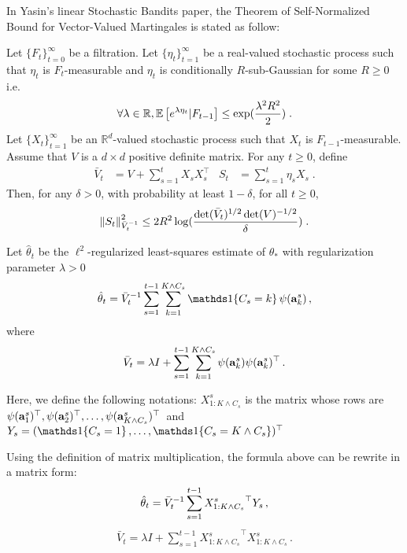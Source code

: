 In Yasin's linear Stochastic Bandits paper, the Theorem of Self-Normalized Bound for Vector-Valued Martingales is stated as follow:
\begin{theorem}
\label{theorem:martingale-bound}
Let $\{F_t\}_{t=0}^\infty$ be a filtration. Let $\{\eta_t\}_{t=1}^\infty$ be a real-valued stochastic process such that $\eta_t$
is $F_t$-measurable and $\eta_t$ is conditionally $R$-sub-Gaussian for some $R \ge 0$ i.e.
\begin{align*}
\forall \lambda \in \mathbb{R} , \mathbb{E} \left[e^{\lambda \eta_t} | F_{t-1}\right] \le \exp( \frac{\lambda^2R^2}{2}) \; .
\end{align*}
Let $\{X_t\}_{t=1}^\infty$ be an $\mathbb{R}^d$-valued stochastic process such that $X_t$ is $F_{t-1}$-measurable.
Assume that $V$ is a $d \times d$ positive definite matrix. For any $t \ge 0$, define
\begin{align*}
\bar{V}_t &= V + \sum_{s=1}^t X_s X_s^\top
&
S_t &= \sum_{s=1}^t \eta_s X_s \; .
\end{align*}
Then, for any $\delta > 0$, with probability at least $1-\delta$, for all $t \ge 0$,
$$
\left\|S_t\right\|_{\bar{V}_t^{-1}}^2
\le
2 R^2 \log( \frac{\det (\bar{V}_t)^{1/2} \det(V)^{-1/2}}{\delta} ) \; .
$$
\end{theorem}


Let $\hat{\theta}_t$ be the $\ell^2$-regularized least-squares estimate of $\theta_*$ with regularization parameter $\lambda > 0$
\begin{align*}
  \hat{\rnd{\theta}}_t = \bar{V}_t^{-1} \sum_{s=1}^{t-1} \sum_{k=1}^{K \wedge C_s}
  \I{C_s=k} \psi(\rnd{a}^s_k)\,,
\end{align*}
where
\[
\bar{V}_t = \lambda I + \sum_{s=1}^{t-1} \sum_{k=1}^{K \wedge C_s}
\psi(\mathbf{a}^s_k) \psi(\mathbf{a}^s_k)^\top\,.
\]

Here, we define the following notations:
$X^s_{1 : K \wedge C_s}$ is the matrix whose rows are
$\psi(\mathbf{a}^s_1)^\top, \psi(\mathbf{a}^s_2)^\top, \dots, \psi(\mathbf{a}^s_{ K \wedge C_s})^\top \,$ and
$Y_s = (\I{C_s=1}, \dots, \I{C_s= K \wedge C_s})^\top\,$

Using the definition of matrix multiplication, the formula above can be rewrite in a matrix form:
\begin{align*}
  \hat{\mathbf{\theta}}_t = \bar{V}_t^{-1} \sum_{s=1}^{t-1} {X^s_{1 : K \wedge C_s}}^\top Y_s \,,
\end{align*}
\begin{align*}
\bar{V}_t = \lambda I + \sum_{s=1}^{t-1} {X^s_{1 : K \wedge C_s}}^\top X^s_{1 : K \wedge C_s} \,.
\end{align*}

